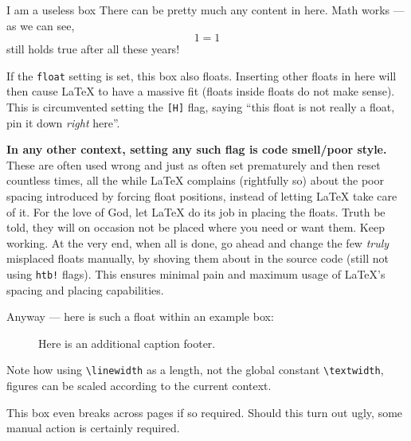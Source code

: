 \begin{example}[%
        label={ex:example},%
    ]{%
        I am a useless box%
    }
    There can be pretty much any content in here.
    Math works --- as we can see,
    \begin{equation}
        1 = 1
    \end{equation}
    still holds true after all these years!
    
    If the \verb|float| setting is set, this box also floats.
    Inserting other floats in here will then cause \LaTeX{} to have a massive fit
    (floats inside floats do not make sense).
    This is circumvented setting the \verb|[H]| flag,
    saying \enquote{this float is not really a float, pin it down \emph{right} here}.
    
    \textbf{In any other context, setting any such flag is code smell/poor style.}
    These are often used wrong and just as often set prematurely and then reset
    countless times, all the while \LaTeX{} complains (rightfully so) about the poor
    spacing introduced by forcing float positions, instead of letting \LaTeX{} take
    care of it.
    For the love of God, let \LaTeX{} do its job in placing the floats.
    Truth be told, they will on occasion not be placed where you need or want them.
    Keep working.
    At the very end, when all is done, go ahead and change the few \emph{truly}
    misplaced floats manually, by shoving them about in the source code
    (still not using \verb|htb!| flags).
    This ensures minimal pain and maximum usage of \LaTeX{}'s spacing and placing
    capabilities.
    
    Anyway --- here is such a float within an example box:
        \begin{figure}[tbp]

        \begin{minipage}[t]{0.62\linewidth}
            
        \end{minipage}
        \hfill
        \begin{minipage}[t]{0.32\linewidth}
            \raggedright
            \label{fig:inside_float}
            \caption*{Here is an additional caption footer.}
        \end{minipage}
    
    \end{figure}
    
    Note how using \verb|\linewidth| as a length, not the global constant
    \verb|\textwidth|, figures can be scaled according to the current context.
    
    This box even breaks across pages if so required.
    Should this turn out ugly, some manual action is certainly required.
\end{example}

